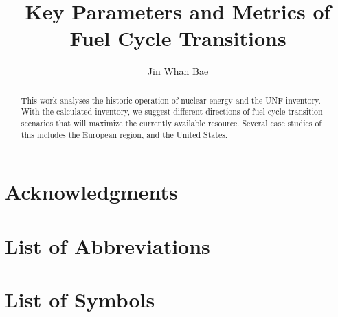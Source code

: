 \documentclass{article}
\begin{document}
\title{Key Parameters and Metrics of Fuel Cycle Transitions}
\author{Jin Whan Bae}


\begin{abstract}
This work analyses the historic operation of nuclear energy and the \gls{UNF} inventory.
With the calculated inventory, we suggest different
directions of fuel cycle transition scenarios that will maximize the currently
available resource. Several case studies of this includes the European region,
and the United States.
\end{abstract} 

\chapter*{Acknowledgments}



\tableofcontents
\listoftables
\listoffigures

\chapter{List of Abbreviations}
\printglossaries
\chapter{List of Symbols}


\pagebreak
\end{document}
